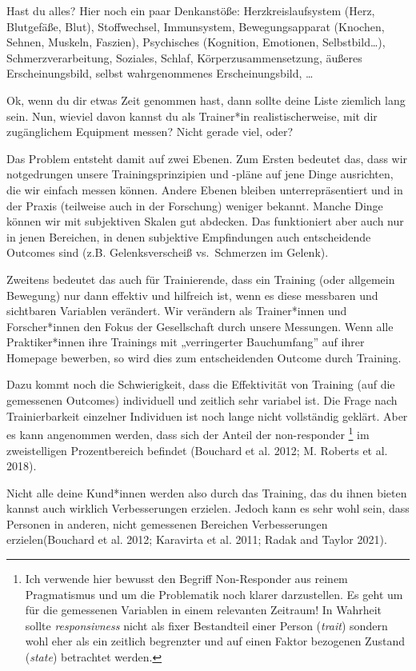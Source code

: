 \documentclass[
  letterpaper,
  DIV=11,
  numbers=noendperiod]{scrreprt}
\begin{document}
Hast du alles? Hier noch ein paar Denkanstöße: Herzkreislaufsystem
(Herz, Blutgefäße, Blut), Stoffwechsel, Immunsystem, Bewegungsapparat
(Knochen, Sehnen, Muskeln, Faszien), Psychisches (Kognition, Emotionen,
Selbstbild\ldots), Schmerzverarbeitung, Soziales, Schlaf,
Körperzusammensetzung, äußeres Erscheinungsbild, selbst wahrgenommenes
Erscheinungsbild, \ldots{}

Ok, wenn du dir etwas Zeit genommen hast, dann sollte deine Liste
ziemlich lang sein. Nun, wieviel davon kannst du als Trainer*in
realistischerweise, mit dir zugänglichem Equipment messen? Nicht gerade
viel, oder?

Das Problem entsteht damit auf zwei Ebenen. Zum Ersten bedeutet das,
dass wir notgedrungen unsere Trainingsprinzipien und -pläne auf jene
Dinge ausrichten, die wir einfach messen können. Andere Ebenen bleiben
unterrepräsentiert und in der Praxis (teilweise auch in der Forschung)
weniger bekannt. Manche Dinge können wir mit subjektiven Skalen gut
abdecken. Das funktioniert aber auch nur in jenen Bereichen, in denen
subjektive Empfindungen auch entscheidende Outcomes sind (z.B.
Gelenksverscheiß vs.~Schmerzen im Gelenk).

Zweitens bedeutet das auch für Trainierende, dass ein Training (oder
allgemein Bewegung) nur dann effektiv und hilfreich ist, wenn es diese
messbaren und sichtbaren Variablen verändert. Wir verändern als
Trainer*innen und Forscher*innen den Fokus der Gesellschaft durch unsere
Messungen. Wenn alle Praktiker*innen ihre Trainings mit „verringerter
Bauchumfang'' auf ihrer Homepage bewerben, so wird dies zum
entscheidenden Outcome durch Training.

Dazu kommt noch die Schwierigkeit, dass die Effektivität von Training
(auf die gemessenen Outcomes) individuell und zeitlich sehr variabel
ist. Die Frage nach Trainierbarkeit einzelner Individuen ist noch lange
nicht vollständig geklärt. Aber es kann angenommen werden, dass sich der
Anteil der non-responder \footnote{Ich verwende hier bewusst den Begriff
  Non-Responder aus reinem Pragmatismus und um die Problematik noch
  klarer darzustellen. Es geht um für die gemessenen Variablen in einem
  relevanten Zeitraum! In Wahrheit sollte \emph{responsivness} nicht als
  fixer Bestandteil einer Person (\emph{trait}) sondern wohl eher als
  ein zeitlich begrenzter und auf einen Faktor bezogenen Zustand
  (\emph{state}) betrachtet werden.} im zweistelligen Prozentbereich
befindet (Bouchard et al. 2012; M. Roberts et al. 2018).

Nicht alle deine Kund*innen werden also durch das Training, das du ihnen
bieten kannst auch wirklich Verbesserungen erzielen. Jedoch kann es sehr
wohl sein, dass Personen in anderen, nicht gemessenen Bereichen
Verbesserungen erzielen(Bouchard et al. 2012; Karavirta et al. 2011;
Radak and Taylor 2021).
\end{document}
